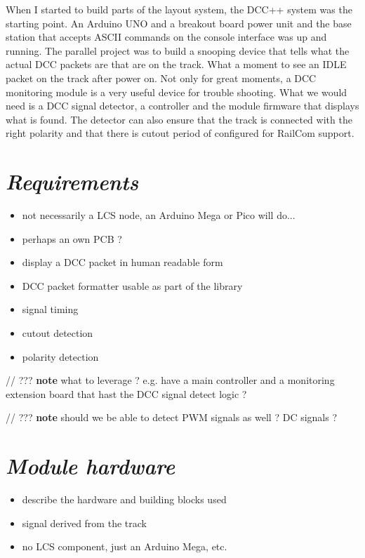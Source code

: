 
When I started to build parts of the layout system, the DCC++ system was the starting point. An Arduino UNO and a breakout board power unit and the base station that accepts ASCII commands on the console interface was up and running. The parallel project was to build a snooping device that tells what the actual DCC packets are that are on the track. What a moment to see an IDLE packet on the track after power on. Not only for great moments, a DCC monitoring module is a very useful device for trouble shooting. What we would need is a DCC signal detector, a controller and the module firmware that displays what is found. The detector can also ensure that the track is connected with the right polarity and that there is cutout period of configured for RailCom support.

\section{\textit{Requirements}}
\begin{itemize}
\item not necessarily a LCS node, an Arduino Mega or Pico will do...
\item perhaps an own PCB ?
\item display a DCC packet in human readable form
\item DCC packet formatter usable as part of the library
\item signal timing
\item cutout detection
\item polarity detection
\end{itemize}

// ??? \textbf{note} what to leverage ? e.g. have a main controller and a monitoring extension board that hast the DCC signal detect logic ?

// ??? \textbf{note} should we be able to detect PWM signals as well ? DC signals ?


\section{\textit{Module hardware}}
\begin{itemize}
\item describe the hardware and building blocks used
\item signal derived from the track
\item no LCS component, just an Arduino Mega, etc.
\end{itemize}


